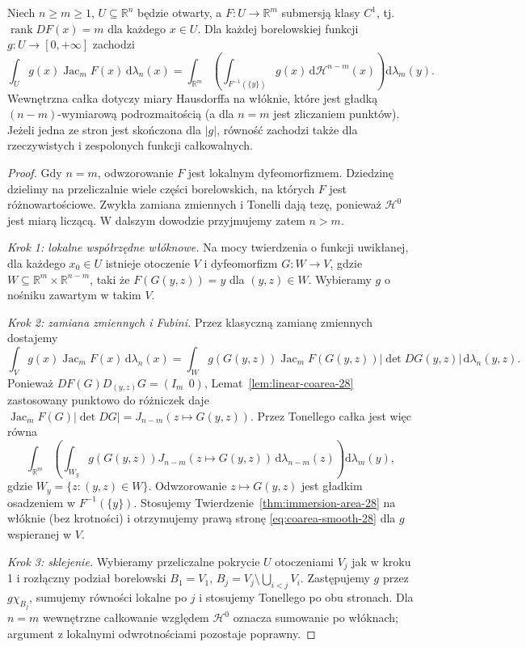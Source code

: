 \begin{twierdzenie}
\label{thm:coarea-submersion-28}
Niech $n\ge m\ge1$, $U\subseteq\mathbb R^n$
będzie otwarty, a $F:U\to\mathbb R^m$
submersją klasy $C^1$, tj.
$\operatorname{rank}DF(x)=m$ dla każdego $x\in U$.
Dla każdej borelowskiej funkcji $g:U\to[0,+\infty]$
zachodzi
\begin{equation}\label{eq:coarea-smooth-28}
 \int_U g(x)\operatorname{Jac}_mF(x)\,\mathrm d\lambda_n(x)
 =\int_{\mathbb R^m}\left(
 \int_{F^{-1}(\{y\})}g(x)\,\mathrm d\mathcal H^{n-m}(x)
 \right)\mathrm d\lambda_m(y).
\end{equation}
Wewnętrzna całka dotyczy miary Hausdorffa
na włóknie, które jest gładką
$(n-m)$-wymiarową podrozmaitością (a dla
$n=m$ jest zliczaniem punktów). Jeżeli jedna ze stron
jest skończona dla $|g|$, równość zachodzi także
dla rzeczywistych i zespolonych funkcji całkowalnych.
\end{twierdzenie}
\begin{proof}
Gdy $n=m$, odwzorowanie $F$ jest lokalnym
dyfeomorfizmem. Dziedzinę dzielimy na przeliczalnie
wiele części borelowskich, na których $F$ jest
różnowartościowe. Zwykła zamiana zmiennych i
Tonelli dają tezę, ponieważ
$\mathcal H^0$ jest miarą liczącą. W dalszym
dowodzie przyjmujemy zatem $n>m$.

\emph{Krok 1: lokalne współrzędne włóknowe.}
Na mocy twierdzenia o funkcji uwikłanej, dla
każdego $x_0\in U$ istnieje otoczenie $V$ i
dyfeomorfizm $G:W\to V$, gdzie
$W\subseteq\mathbb R^m\times\mathbb R^{n-m}$,
taki że $F(G(y,z))=y$ dla $(y,z)\in W$.
Wybieramy $g$ o nośniku zawartym w takim $V$.

\emph{Krok 2: zamiana zmiennych i Fubini.}
Przez klasyczną zamianę zmiennych dostajemy
\[
 \int_V g(x)\operatorname{Jac}_mF(x)\,\mathrm d\lambda_n(x)
 =\int_W g(G(y,z))\operatorname{Jac}_mF(G(y,z))
 |\det DG(y,z)|\,\mathrm d\lambda_n(y,z).
\]
Ponieważ $DF(G)D_{(y,z)}G=(I_m\ \ 0)$,
Lemat~\ref{lem:linear-coarea-28} zastosowany
punktowo do różniczek daje
$\operatorname{Jac}_mF(G)|\det DG|=
J_{n-m}(z\mapsto G(y,z))$.
Przez Tonellego całka jest więc równa
\[
 \int_{\mathbb R^m}\left(\int_{W_y}
 g(G(y,z))J_{n-m}(z\mapsto G(y,z))
 \,\mathrm d\lambda_{n-m}(z)\right)\mathrm d\lambda_m(y),
\]
gdzie $W_y=\{z:(y,z)\in W\}$.
Odwzorowanie $z\mapsto G(y,z)$ jest gładkim
osadzeniem w $F^{-1}(\{y\})$. Stosujemy
Twierdzenie~\ref{thm:immersion-area-28} na włóknie
(bez krotności) i otrzymujemy prawą stronę
\eqref{eq:coarea-smooth-28} dla $g$ wspieranej w $V$.

\emph{Krok 3: sklejenie.}
Wybieramy przeliczalne pokrycie $U$ otoczeniami
$V_j$ jak w kroku 1 i rozłączny podział borelowski
$B_1=V_1$, $B_j=V_j\setminus\bigcup_{i<j}V_i$.
Zastępujemy $g$ przez $g\chi_{B_j}$, sumujemy
równości lokalne po $j$ i stosujemy Tonellego
po obu stronach. Dla $n=m$ wewnętrzne całkowanie
względem $\mathcal H^0$ oznacza sumowanie po
włóknach; argument z lokalnymi odwrotnościami
pozostaje poprawny.
\end{proof}

